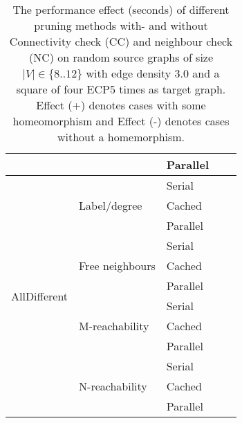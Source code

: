 \begin{table}[]
\begin{tabular}{|l|l|l|l|l|}
                               &                                  & Parallel             &                     &                     \\ \hline
\multirow{12}{*}{AllDifferent} & \multirow{3}{*}{Label/degree}    & Serial               &                     &                     \\ \cline{3-5} 
                               &                                  & Cached               &                     &                     \\ \cline{3-5} 
                               &                                  & Parallel             &                     &                     \\ \cline{2-5} 
                               & \multirow{3}{*}{Free neighbours} & Serial               &                     &                     \\ \cline{3-5} 
                               &                                  & Cached               &                     &                     \\ \cline{3-5} 
                               &                                  & Parallel             &                     &                     \\ \cline{2-5} 
                               & \multirow{3}{*}{M-reachability}  & Serial               &                     &                     \\ \cline{3-5} 
                               &                                  & Cached               &                     &                     \\ \cline{3-5} 
                               &                                  & Parallel             &                     &                     \\ \cline{2-5} 
                               & \multirow{3}{*}{N-reachability}  & Serial               &                     &                     \\ \cline{3-5} 
                               &                                  & Cached               &                     &                     \\ \cline{3-5} 
                               &                                  & Parallel             &                     &                     \\ \hline
\end{tabular}
\caption{The performance effect (seconds) of different pruning methods with- and without Connectivity check (CC) and neighbour check (NC) on random source graphs of size $|V|\in \{8..12\}$ with edge density 3.0 and a square of four ECP5 times as target graph. Effect (+) denotes cases with some homeomorphism and Effect (-) denotes cases without a homemorphism.}
\label{tab:pruning-performance-small}
\end{table}



